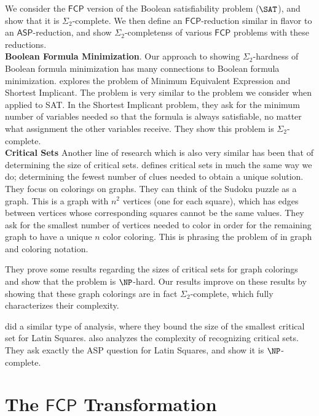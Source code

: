 \documentclass[runningheads,a4paper]{llncs}
\begin{document}
We consider the $\mathsf{FCP}$ version of the Boolean satisfiability problem ($\SAT$), and show that it is $\Sigma_2$-complete. We then define an $\mathsf{FCP}$-reduction similar in flavor to an $\mathsf{ASP}$-reduction, and show $\Sigma_2$-completenss of various $\mathsf{FCP}$ problems with these reductions.\\

\noindent\textbf{Boolean Formula Minimization}. Our approach to showing $\Sigma_2$-hardness of Boolean formula minimization has many connections to Boolean formula minimization. \cite{umans}\cite{umans2001minimum} explores the problem of Minimum Equivalent Expression and Shortest Implicant. The problem is very similar to the problem we consider when applied to SAT. In the Shortest Implicant problem, they ask for the minimum number of variables needed so that the formula is always satisfiable, no matter what assignment the other variables receive. They show this problem is $\Sigma_2$-complete.  \\

\noindent\textbf{Critical Sets} Another line of research which is also very similar has been that of determining the size of critical sets. \cite{Cooper:2014:CSS:2612293.2612628} defines critical sets in much the same way we do; determining the fewest number of clues needed to obtain a unique solution. They focus on colorings on graphs. They can think of the Sudoku puzzle as a graph. This is a graph with $n^2$ vertices (one for each square), which has edges between vertices whose corresponding squares cannot be the same values. They ask for the smallest number of vertices needed to color in order for the remaining graph to have a unique $n$ color coloring. This is phrasing the problem of \cite{mcguire2012there} in graph and coloring notation. 

They prove some results regarding the sizes of critical sets for graph colorings and show that the problem is $\NP$-hard. Our results improve on these results by showing that these graph colorings are in fact $\Sigma_2$-complete, which fully characterizes their complexity.

\cite{Ghandehari2005121} did a similar type of analysis, where they bound the size of the smallest critical set for Latin Squares. \cite{1984computational} also analyzes the complexity of recognizing critical sets. They ask exactly the ASP question for Latin Squares, and show it is $\NP$-complete.


\section{The $\mathsf{FCP}$ Transformation}
\label{sec:prelim}
\end{document}
